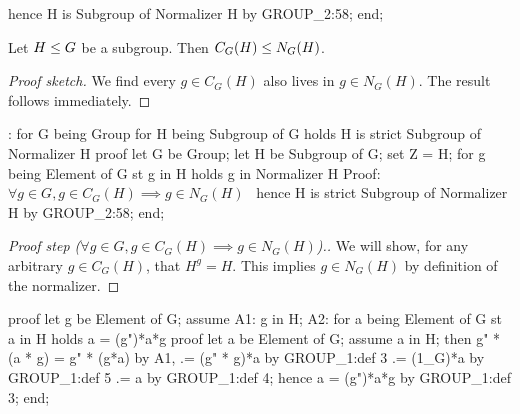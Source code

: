   hence H is Subgroup of Normalizer H by GROUP_2:58;
end;
\eatline
{}\nwendcode{}\nwdocspar
\begin{lemma}
Let $H\leq G$ be a subgroup. Then $C_{G}(H)\leq N_{G}(H)$.
\end{lemma}

\begin{proof}[Proof sketch]
We find every $g\in C_{G}(H)$ also lives in $g\in N_{G}(H)$. The result
follows immediately.
\end{proof}

\nwenddocs{}\endmoddef\nwstartdeflinemarkup{}\nwenddeflinemarkup
{}:
  for G being Group
  for H being Subgroup of G
  holds  H is strict Subgroup of Normalizer H
proof
  let G be Group;
  let H be Subgroup of G;
  set Z =  H;
  for g being Element of G st g in  H holds g in Normalizer H
  \LA{}Proof: $\forall g\in G, g\in C_{G}(H)\implies g\in N_{G}(H)$~{\nwtagstyle{}}\RA{}
  hence  H is strict Subgroup of Normalizer H by GROUP_2:58;
end;
\eatline
{}\nwendcode{}\nwdocspar
\begin{proof}[Proof step ($\forall g\in G, g\in C_{G}(H)\implies g\in N_{G}(H)$).]
We will show, for any arbitrary $g\in C_{G}(H)$, that $H^{g} = H$. This
implies $g\in N_{G}(H)$ by definition of the normalizer.
\end{proof}

\nwenddocs{}\endmoddef\nwstartdeflinemarkup{}\nwenddeflinemarkup
proof
  let g be Element of G;
  assume A1: g in  H;
  A2: for a being Element of G st a in H holds a = (g")*a*g
  proof
    let a be Element of G;
    assume a in H;
    then g" * (a * g) = g" * (g*a) by A1,
                     .= (g" * g)*a by GROUP_1:def 3
                     .= (1_G)*a by GROUP_1:def 5
                     .= a by GROUP_1:def 4;
    hence a = (g")*a*g by GROUP_1:def 3;
  end;

